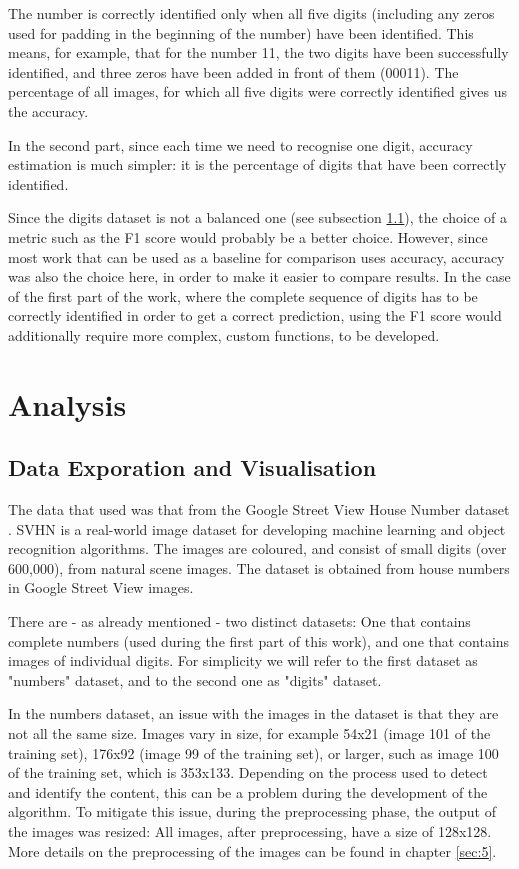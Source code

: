\documentclass[final,12p,times]{elsarticle}
\begin{document}
The number is correctly identified only when all five digits (including any zeros used for padding in the beginning of the 
number) have been identified.
This means, for example, that for the number 11, the two digits have been successfully identified, and three zeros have been 
added in front of them (00011).
The percentage of all images, for which all five digits were correctly identified gives us the accuracy.

In the second part, since each time we need to recognise one digit, accuracy estimation is much simpler:
it is the percentage of digits that have been correctly identified.

Since the digits dataset is not a balanced one (see subsection \ref{sec:4.1}), the choice of a metric such as the F1 score 
would probably be a better choice.
However, since most work that can be used as a baseline for comparison uses accuracy, accuracy was also the choice here, in 
order to make it easier to compare results.
In the case of the first part of the work, where the complete sequence of digits has to be correctly identified in order to 
get a correct prediction, using the F1 score would additionally require more complex, custom functions, to be developed.

\section{Analysis}
\subsection{Data Exporation and Visualisation}
\label{sec:4.1}
The data that used was that from the Google Street View House Number dataset \cite{ 37648}. 
SVHN is a real-world image dataset for developing machine learning and object recognition algorithms. 
The images are coloured, and consist of small digits (over 600,000), from natural scene images. 
The dataset is obtained from house numbers in Google Street View images.

There are - as already mentioned - two distinct datasets:
One that contains complete numbers (used during the first part of this work), and one that contains images of individual digits.
For simplicity we will refer to the first dataset as "numbers" dataset, and to the second one as "digits" dataset.

In the numbers dataset, an issue with the images in the dataset is that they are not all the same size.
Images vary in size, for example 54x21 (image 101 of the training set), 176x92 (image 99 of the training set), or larger, such 
as image 100 of the training set, which is 353x133.
Depending on the process used to detect and identify the content, this can be a problem during the development of the algorithm.
To mitigate this issue, during the preprocessing phase, the output of the images was resized: 
All images, after preprocessing, have a size of 128x128.
More details on the preprocessing of the images can be found in chapter \ref{sec:5}.
\end{document}
